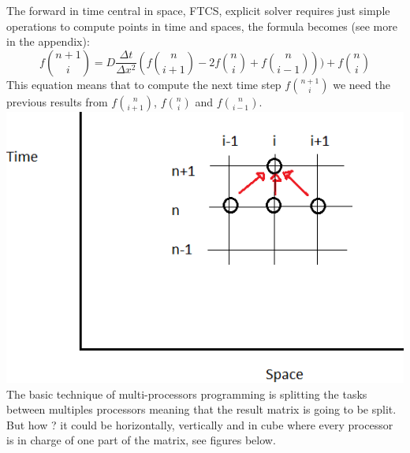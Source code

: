 \documentclass[12pt, a4paper]{report}
\begin{document}
The forward in time central in space, FTCS, explicit solver requires just simple operations to compute points in time and spaces, the formula becomes (see more in the appendix):\begin{equation}f\binom{n+1}{i} = D\frac{\Delta t}{\Delta x^{2}}(f\binom{n}{i+1}-2f\binom{n}{i}+f\binom{n}{i-1}))+f\binom{n}{i}
\end{equation} 
This equation means that to compute the next time step $f\binom{n+1}{i}$ we need the previous results from $f\binom{n}{i+1}$, $f\binom{n}{i}$ and $f\binom{n}{i-1}$.\\
\includegraphics[scale=0.4]{report/stencil.png}\\
The basic technique of multi-processors programming is splitting the tasks between multiples processors meaning that the result matrix is going to be split. But how ? it could be horizontally, vertically and in cube where every processor is in charge of one part of the matrix, see figures below.
\end{document}
